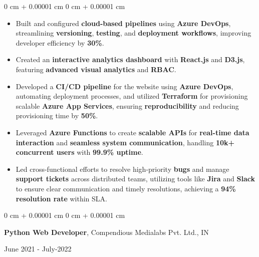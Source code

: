 \documentclass[10pt, letterpaper]{article}
\newenvironment{highlights}{
    \begin{itemize}[
        topsep=0.10 cm,
        parsep=0.10 cm,
        partopsep=0pt,
        itemsep=0pt,
        leftmargin=0 cm + 10pt
    ]
}{
    \end{itemize}
} %
\newenvironment{onecolentry}{
    \begin{adjustwidth}{
        0 cm + 0.00001 cm
    }{
        0 cm + 0.00001 cm
    }
}{
    \end{adjustwidth}
} %
\newenvironment{twocolentry}[2][]{
    \onecolentry
    \def\secondColumn{#2}
    \setcolumnwidth{\fill, 4.5 cm}
    \begin{paracol}{2}
}{
    \switchcolumn \raggedleft \secondColumn
    \end{paracol}
    \endonecolentry
} %
\begin{document}
\begin{onecolentry}
\begin{highlights}
		\item Built and configured \textbf{cloud-based pipelines} using \textbf{Azure DevOps}, streamlining \textbf{versioning}, \textbf{testing}, and \textbf{deployment workflows}, improving developer efficiency by \textbf{30\%}.
		\item Created an \textbf{interactive analytics dashboard} with \textbf{React.js} and \textbf{D3.js}, featuring \textbf{advanced visual analytics} and \textbf{RBAC}.
		\item Developed a \textbf{CI/CD pipeline} for the website using \textbf{Azure DevOps}, automating deployment processes, and utilized \textbf{Terraform} for provisioning scalable \textbf{Azure App Services}, ensuring \textbf{reproducibility} and reducing provisioning time by \textbf{50\%}.
		\item Leveraged \textbf{Azure Functions} to create \textbf{scalable APIs} for \textbf{real-time data interaction} and \textbf{seamless system communication}, handling \textbf{10k+ concurrent users} with \textbf{99.9\% uptime}.
		\item Led cross-functional efforts to resolve high-priority \textbf{bugs} and manage \textbf{support tickets} across distributed teams, utilizing tools like \textbf{Jira} and \textbf{Slack} to ensure clear communication and timely resolutions, achieving a \textbf{94\% resolution rate} within SLA.
	\end{highlights}
\end{onecolentry}




\vspace{0.15 cm}
\begin{twocolentry}{
		June 2021 - July-2022
	}
	\textbf{Python Web Developer}, Compendious Medialabs Pvt. Ltd., IN
\end{twocolentry}
\end{document}
